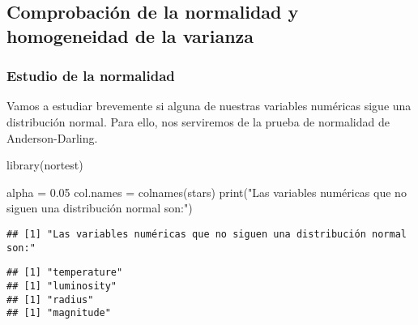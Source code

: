 \documentclass[
]{article}
\newenvironment{Shaded}{\begin{snugshade}}{\end{snugshade}}
\newcommand{\ControlFlowTok}[1]{\textcolor[rgb]{0.94,0.87,0.69}{#1}}
\newcommand{\DecValTok}[1]{\textcolor[rgb]{0.86,0.86,0.80}{#1}}
\newcommand{\FloatTok}[1]{\textcolor[rgb]{0.75,0.75,0.82}{#1}}
\newcommand{\FunctionTok}[1]{\textcolor[rgb]{0.94,0.94,0.56}{#1}}
\newcommand{\NormalTok}[1]{\textcolor[rgb]{0.80,0.80,0.80}{#1}}
\newcommand{\OtherTok}[1]{\textcolor[rgb]{0.94,0.94,0.56}{#1}}
\newcommand{\SpecialCharTok}[1]{\textcolor[rgb]{0.86,0.64,0.64}{#1}}
\newcommand{\StringTok}[1]{\textcolor[rgb]{0.80,0.58,0.58}{#1}}
\begin{document}
\hypertarget{comprobaciuxf3n-de-la-normalidad-y-homogeneidad-de-la-varianza}{%
\subsection{Comprobación de la normalidad y homogeneidad de la
varianza}\label{comprobaciuxf3n-de-la-normalidad-y-homogeneidad-de-la-varianza}}

\hypertarget{estudio-de-la-normalidad}{%
\subsubsection{Estudio de la
normalidad}\label{estudio-de-la-normalidad}}

Vamos a estudiar brevemente si alguna de nuestras variables numéricas
sigue una distribución normal. Para ello, nos serviremos de la prueba de
normalidad de Anderson-Darling.

\begin{Shaded}
\begin{Highlighting}[]
\FunctionTok{library}\NormalTok{(nortest)}

\NormalTok{alpha }\OtherTok{=} \FloatTok{0.05}
\NormalTok{col.names }\OtherTok{=} \FunctionTok{colnames}\NormalTok{(stars)}
\FunctionTok{print}\NormalTok{(}\StringTok{"Las variables numéricas que no siguen una distribución normal son:"}\NormalTok{)}
\end{Highlighting}
\end{Shaded}

\begin{verbatim}
## [1] "Las variables numéricas que no siguen una distribución normal son:"
\end{verbatim}

\begin{Shaded}
\end{Shaded}

\begin{verbatim}
## [1] "temperature"
## [1] "luminosity"
## [1] "radius"
## [1] "magnitude"
\end{verbatim}
\end{document}
